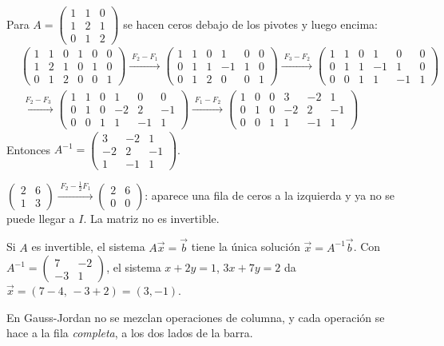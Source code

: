 \documentclass[11pt,a4paper]{article}
\newcommand{\aug}[2]{\left(\begin{array}{#1}#2\end{array}\right)}
\newcommand{\op}[1]{\xrightarrow{\;#1\;}}
\newcommand{\sm}[1]{\left(\begin{smallmatrix}#1\end{smallmatrix}\right)}
\begin{document}
\begin{ejemplo}
Para $A=\sm{1&1&0\\1&2&1\\0&1&2}$ se hacen ceros debajo de los pivotes y luego encima:
\begin{align*}
&\aug{ccc|ccc}{1&1&0&1&0&0\\ 1&2&1&0&1&0\\ 0&1&2&0&0&1}
\op{F_2-F_1}\aug{ccc|ccc}{1&1&0&1&0&0\\ 0&1&1&-1&1&0\\ 0&1&2&0&0&1}
\op{F_3-F_2}\aug{ccc|ccc}{1&1&0&1&0&0\\ 0&1&1&-1&1&0\\ 0&0&1&1&-1&1}\\[4pt]
&\op{F_2-F_3}\aug{ccc|ccc}{1&1&0&1&0&0\\ 0&1&0&-2&2&-1\\ 0&0&1&1&-1&1}
\op{F_1-F_2}\aug{ccc|ccc}{1&0&0&3&-2&1\\ 0&1&0&-2&2&-1\\ 0&0&1&1&-1&1}
\end{align*}
Entonces $A^{-1}=\sm{3&-2&1\\-2&2&-1\\1&-1&1}$.
\end{ejemplo}

\begin{ejemplo}
$\begin{pmatrix} 2 & 6\\ 1 & 3\end{pmatrix}\op{F_2-\frac12F_1}\begin{pmatrix} 2 & 6\\ 0 & 0\end{pmatrix}$:
aparece una fila de ceros a la izquierda y ya no se puede llegar a $I$. La matriz no es invertible.
\end{ejemplo}

\begin{propiedad}
Si $A$ es invertible, el sistema $A\vec x=\vec b$ tiene la única solución $\vec x=A^{-1}\vec b$.
Con $A^{-1}=\sm{7&-2\\-3&1}$, el sistema $x+2y=1$, $3x+7y=2$ da $\vec x=(7-4,\,-3+2)=(3,-1)$.
\end{propiedad}

\begin{ojo}
En Gauss-Jordan no se mezclan operaciones de columna, y cada operación se hace a la fila \emph{completa}, a los dos lados de la barra.
\end{ojo}
\end{document}
